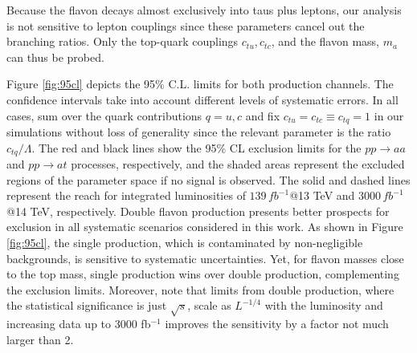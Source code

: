 \documentclass[prd,amsfonts,onecolumn,superscriptaddress,aps,nofootinbib,11pt]{revtex4-1}
\begin{document}
Because the flavon decays almost exclusively into taus plus leptons, our analysis is not sensitive to lepton couplings since these parameters cancel out the branching ratios. Only the top-quark couplings $c_{tu}, c_{tc}$, and the flavon mass, $m_a$ can thus be probed. 

Figure \ref{fig:95cl} depicts the 95\% C.L. limits for both production channels. The confidence intervals take into account different levels of systematic errors. In all cases, sum over the quark contributions $q=u,c$ and fix $c_{tu}=c_{tc}\equiv c_{tq} =1$ in our simulations without loss of generality since the relevant parameter is the ratio $c_{tq}/\Lambda$. The red and black lines show the 95\% CL exclusion limits for the $pp \to aa$ and $pp \to at$ processes, respectively, and the shaded areas represent the excluded regions of the parameter space if no signal is observed. The solid and dashed lines represent the reach for integrated luminosities of $139 \, \si{fb^{-1}}$@13 TeV and $3000 \, \si{fb^{-1}}$@14 TeV, respectively. Double flavon production presents better prospects for exclusion in all systematic scenarios considered in this work. As shown in Figure \ref{fig:95cl}, the single production, which is contaminated by non-negligible backgrounds, is sensitive to systematic uncertainties. Yet, for flavon masses close to the top mass, single production wins over double production, complementing the exclusion limits. Moreover, note that limits from double production, where the statistical significance is just $\sqrt{s}$, scale as $L^{-1/4}$ with the luminosity and increasing data up to 3000 fb$^{-1}$ improves the sensitivity by a factor not much larger than 2.
%
\end{document}
